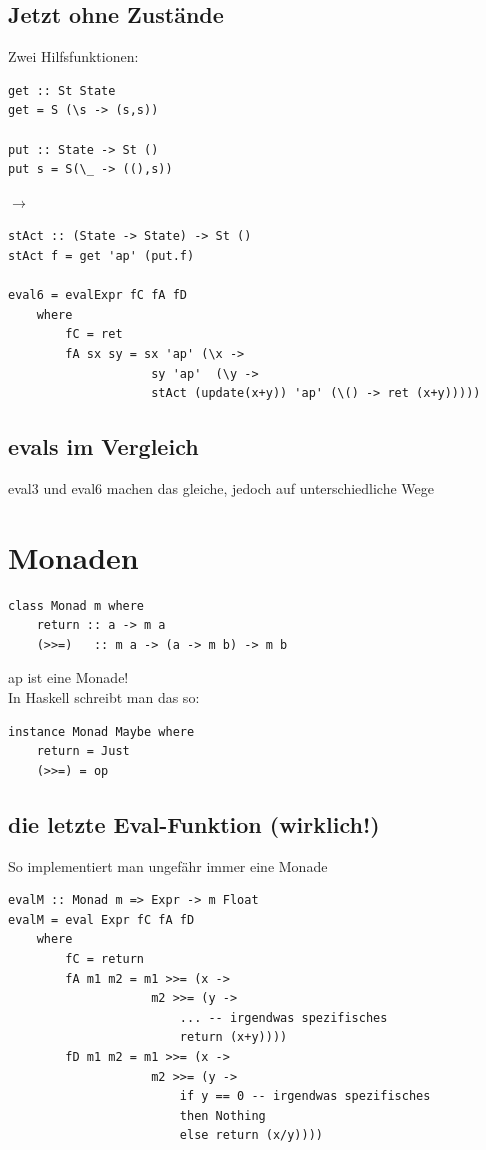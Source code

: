 \documentclass[ngerman,a4paper]{report}
\begin{document}
\subsection{Jetzt ohne Zustände}
Zwei Hilfsfunktionen:\\

\begin{lstlisting}
get :: St State
get = S (\s -> (s,s))

put :: State -> St ()
put s = S(\_ -> ((),s))
\end{lstlisting}

$\rightarrow$

\begin{lstlisting}
stAct :: (State -> State) -> St ()
stAct f = get 'ap' (put.f)

eval6 = evalExpr fC fA fD
	where
		fC = ret
		fA sx sy = sx 'ap' (\x ->
					sy 'ap'	 (\y -> 
					stAct (update(x+y)) 'ap' (\() -> ret (x+y)))))
\end{lstlisting}

\subsection{evals im Vergleich}
\begin{compactitem}
	\item eval3 und eval6 machen das gleiche, jedoch auf unterschiedliche Wege
\end{compactitem}

\section{Monaden}
\begin{lstlisting}
class Monad m where
	return :: a -> m a
	(>>=)	:: m a -> (a -> m b) -> m b
\end{lstlisting}

ap ist eine Monade!\\
In Haskell schreibt man das so:
\begin{lstlisting}
instance Monad Maybe where
	return = Just
	(>>=) = op
\end{lstlisting}

\subsection{die letzte Eval-Funktion (wirklich!)}
So implementiert man ungefähr immer eine Monade\\
\begin{lstlisting}
evalM :: Monad m => Expr -> m Float
evalM = eval Expr fC fA fD
	where
		fC = return
		fA m1 m2 = m1 >>= (x -> 
					m2 >>= (y ->
						... -- irgendwas spezifisches
						return (x+y))))
		fD m1 m2 = m1 >>= (x -> 
					m2 >>= (y ->
						if y == 0 -- irgendwas spezifisches
						then Nothing
						else return (x/y))))
\end{lstlisting}
\end{document}
